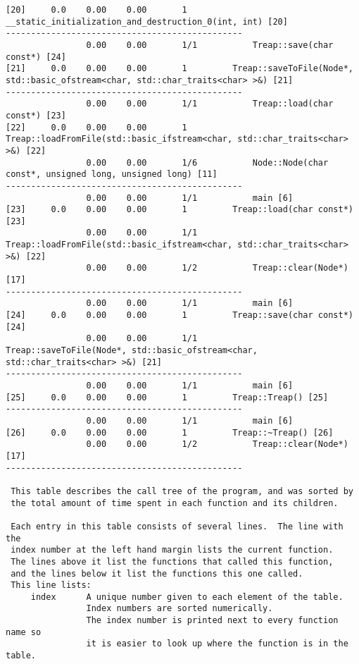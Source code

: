 \documentclass[12pt]{article}
\begin{document}
\begin{lstlisting}[breaklines]
[20]     0.0    0.00    0.00       1         __static_initialization_and_destruction_0(int, int) [20]
-----------------------------------------------
                0.00    0.00       1/1           Treap::save(char const*) [24]
[21]     0.0    0.00    0.00       1         Treap::saveToFile(Node*, std::basic_ofstream<char, std::char_traits<char> >&) [21]
-----------------------------------------------
                0.00    0.00       1/1           Treap::load(char const*) [23]
[22]     0.0    0.00    0.00       1         Treap::loadFromFile(std::basic_ifstream<char, std::char_traits<char> >&) [22]
                0.00    0.00       1/6           Node::Node(char const*, unsigned long, unsigned long) [11]
-----------------------------------------------
                0.00    0.00       1/1           main [6]
[23]     0.0    0.00    0.00       1         Treap::load(char const*) [23]
                0.00    0.00       1/1           Treap::loadFromFile(std::basic_ifstream<char, std::char_traits<char> >&) [22]
                0.00    0.00       1/2           Treap::clear(Node*) [17]
-----------------------------------------------
                0.00    0.00       1/1           main [6]
[24]     0.0    0.00    0.00       1         Treap::save(char const*) [24]
                0.00    0.00       1/1           Treap::saveToFile(Node*, std::basic_ofstream<char, std::char_traits<char> >&) [21]
-----------------------------------------------
                0.00    0.00       1/1           main [6]
[25]     0.0    0.00    0.00       1         Treap::Treap() [25]
-----------------------------------------------
                0.00    0.00       1/1           main [6]
[26]     0.0    0.00    0.00       1         Treap::~Treap() [26]
                0.00    0.00       1/2           Treap::clear(Node*) [17]
-----------------------------------------------

 This table describes the call tree of the program, and was sorted by
 the total amount of time spent in each function and its children.

 Each entry in this table consists of several lines.  The line with the
 index number at the left hand margin lists the current function.
 The lines above it list the functions that called this function,
 and the lines below it list the functions this one called.
 This line lists:
     index      A unique number given to each element of the table.
                Index numbers are sorted numerically.
                The index number is printed next to every function name so
                it is easier to look up where the function is in the table.


\end{lstlisting}
\end{document}
